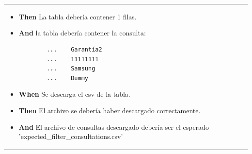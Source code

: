 \begin{longtable}{|p{1cm}|p{2.5cm}|p{12cm}|}
\begin{itemize}
        \item \textbf{Then} La tabla debería contener 1 filas.
        \item \textbf{And} la tabla debería contener la consulta:
        \begin{verbatim}
        ...    Garantía2
        ...    11111111
        ...    Samsung
        ...    Dummy
        \end{verbatim}
        
        \item \textbf{When} Se descarga el csv de la tabla.
        
        \item \textbf{Then} El archivo se debería haber descargado correctamente.
        \item \textbf{And} El archivo de consultas descargado debería ser el esperado 'expected\_filter\_consultations.csv'


\end{itemize}
\end{longtable}
